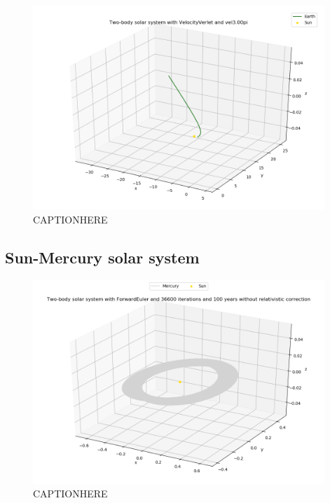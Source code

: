 \documentclass{article}
\begin{document}
    \begin{figure}[H]
        \centering
        \includegraphics[width = 11cm]{img/plot3D_S_E_V_vel300pi.png}
        \caption{CAPTIONHERE}
        \label{fig:plot3D_S_E_V_vel300pi}
    \end{figure}



\subsection{Sun-Mercury solar system}

    \begin{figure}[H]
        \centering
        \includegraphics[width = 11cm]{img/plot3D_S_M_F_n36600_yr100_newton.png}
        \caption{CAPTIONHERE}
        \label{fig:plot3D_S_M_F_n36600_yr100_newton}
    \end{figure}
\end{document}
